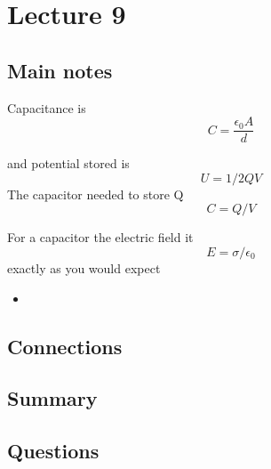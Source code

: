 \section{Lecture 9}
\subsection{Main notes}

Capacitance is
\[
C = \frac{\epsilon_0 A}{d}
  \]

  and potential stored is
\[
U = 1/2 QV
\]
The capacitor needed to store Q
\[
C = Q/V
  \]


  For a capacitor the electric field it
\[
E = \sigma / \epsilon_0
  \]
exactly as you would expect
\begin{itemize}
	\item
\end{itemize}


\subsection{Connections}


\subsection{Summary}


\subsection{Questions}
